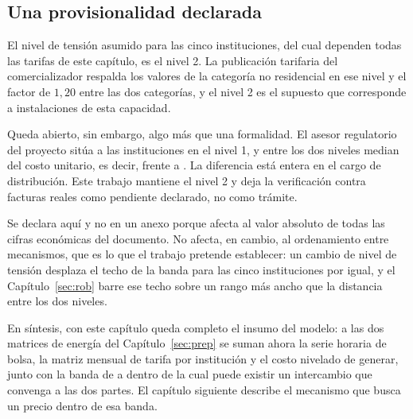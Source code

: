 \subsection{Una provisionalidad declarada}
\label{sub:precios-provisional}

El nivel de tensión asumido para las cinco instituciones, del cual
dependen todas las tarifas de este capítulo, es el nivel 2. La publicación
tarifaria del comercializador respalda los valores de la categoría no
residencial en ese nivel y el factor de $1{,}20$ entre las dos categorías,
y el nivel 2 es el supuesto que corresponde a instalaciones de esta
capacidad.

Queda abierto, sin embargo, algo más que una formalidad. El asesor
regulatorio del proyecto sitúa a las instituciones en el nivel 1, y entre
los dos niveles median  del costo unitario, es decir,
 frente a . La diferencia está entera en
el cargo de distribución. Este trabajo mantiene el nivel 2 y deja la
verificación contra facturas reales como pendiente declarado, no como
trámite.

Se declara aquí y no en un anexo porque afecta al valor absoluto de todas
las cifras económicas del documento. No afecta, en cambio, al
ordenamiento entre mecanismos, que es lo que el trabajo pretende
establecer: un cambio de nivel de tensión desplaza el techo de la banda
para las cinco instituciones por igual, y el Capítulo~\ref{sec:rob} barre
ese techo sobre un rango más ancho que la distancia entre los dos
niveles.

En síntesis, con este capítulo queda completo el insumo del modelo: a las
dos matrices de energía del Capítulo~\ref{sec:prep} se suman ahora la
serie horaria de bolsa, la matriz mensual de tarifa por institución y el
costo nivelado de generar, junto con la banda de  a
 dentro de la cual puede existir un intercambio que
convenga a las dos partes. El capítulo siguiente describe el mecanismo que
busca un precio dentro de esa banda.

